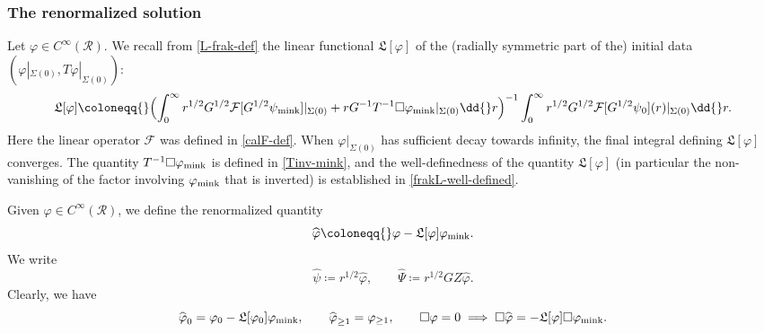 \documentclass[10pt, reqno]{amsart}
\begin{document}
\subsubsection{The renormalized solution}
\label{renormalized-solution}
Let \(\varphi{}\in C^\infty(\mathcal{R})\). We recall from
\cref{L-frak-def} the linear functional \(\mathfrak{L}[\varphi{}]\) of the (radially
symmetric part of the) initial data \((\varphi{}|_{\Sigma{}(0)},T\varphi{}|_{\Sigma{}(0)})\):
\begin{equation*}
\mathfrak{L}[\varphi{}]\coloneqq{}\Bigl(\int_0^\infty r^{1/2}G^{1/2}\mathcal{F}[G^{1/2}\psi{}_{\textnormal{mink}}]|_{\Sigma{}(0)} + rG^{-1}T^{-1}\Box{}\varphi{}_{\textnormal{mink}}|_{\Sigma{}(0)}\dd{}r\Bigr)^{-1}\int_0^\infty r^{1/2}G^{1/2}\mathcal{F}[G^{1/2}\psi{}_0](r)|_{\Sigma{}(0)}\dd{}r.
\end{equation*}
Here the linear operator \(\mathcal{F}\) was defined in \cref{calF-def}. When \(\varphi{}|_{\Sigma{}(0)}\) has sufficient decay
towards infinity, the final integral defining \(\mathfrak{L}[\varphi{}]\)
converges. The quantity \(T^{-1}\Box{}\varphi_{\textnormal{mink}}\) is defined
in \cref{Tinv-mink}, and the well-definedness of the quantity
\(\mathfrak{L}[\varphi{}]\) (in particular the non-vanishing of the factor
involving \(\varphi{}_{\textnormal{mink}}\) that is inverted) is established in
\cref{frakL-well-defined}.
\begin{definition}
Given \(\varphi{}\in C^\infty(\mathcal{R})\), we define the renormalized quantity
\begin{equation}
\widehat{\varphi{}}\coloneqq{}\varphi{}-\mathfrak{L}[\varphi{}]\varphi{}_{\textnormal{mink}}.
\end{equation}
We write
\begin{equation}
\widehat{\psi{}}\coloneqq{}r^{1/2}\widehat{\varphi{}},\qquad \widehat{\Psi{}}\coloneqq{}r^{1/2}GZ\widehat{\varphi{}}.
\end{equation}
Clearly, we have
\begin{equation}
\widehat{\varphi{}}_0 = \varphi_0 - \mathfrak{L}[\varphi{}_0]\varphi_{\textnormal{mink}},\qquad \widehat{\varphi{}}_{\ge 1} = \varphi_{\ge 1},\qquad \Box{}\varphi{} =0 \implies \Box{}\widehat{\varphi{}} = -\mathfrak{L}[\varphi{}]\Box{}\varphi{}_{\textnormal{mink}}.
\end{equation}
\end{definition}
\end{document}
